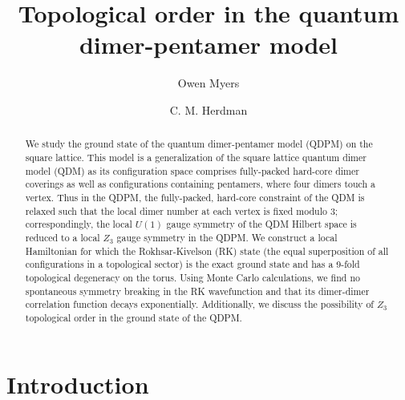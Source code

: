 \documentclass[twocolumn,prb,aps,floatfix,superscriptaddress]{revtex4-1}
\begin{document}
\title{Topological order in the quantum dimer-pentamer model}

\author{Owen Myers}

\author{C. M. Herdman}

\begin{abstract}
We study the ground state of the quantum dimer-pentamer model (QDPM) on the square lattice. This model is a generalization of the square lattice quantum dimer model (QDM) as its configuration space comprises fully-packed hard-core dimer coverings as well as configurations containing pentamers, where four dimers touch a vertex. Thus in the QDPM, the fully-packed, hard-core constraint of the QDM is relaxed such that the local dimer number at each vertex is fixed modulo 3; correspondingly, the local $U(1)$ gauge symmetry of the QDM Hilbert space is reduced to a local $Z_3$ gauge symmetry in the QDPM. We construct a local Hamiltonian for which the Rokhsar-Kivelson (RK) state (the equal superposition of all configurations in a topological sector) is the exact ground state and has a 9-fold topological degeneracy on the torus. Using Monte Carlo calculations, we find no spontaneous symmetry breaking in the RK wavefunction and that its dimer-dimer correlation function decays exponentially. Additionally, we discuss the possibility of $Z_3$ topological order in the ground state of the QDPM.
\end{abstract}

\maketitle

\section{Introduction}
\end{document}
